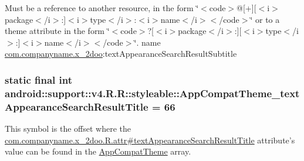 Must be a reference to another resource, in the form \char`\"{}$<$code$>$@\mbox{[}+\mbox{]}\mbox{[}$<$i$>$package$<$/i$>$:\mbox{]}$<$i$>$type$<$/i$>$:$<$i$>$name$<$/i$>$$<$/code$>$\char`\"{} or to a theme attribute in the form \char`\"{}$<$code$>$?\mbox{[}$<$i$>$package$<$/i$>$:\mbox{]}\mbox{[}$<$i$>$type$<$/i$>$:\mbox{]}$<$i$>$name$<$/i$>$$<$/code$>$\char`\"{}.  name \hyperlink{namespacecom_1_1companyname_1_1x__2doo}{com.companyname.x\_\-2doo}:textAppearanceSearchResultSubtitle \hypertarget{classandroid_1_1support_1_1v4_1_1_r_1_1styleable_81d84885678ba9df1805cb1815d7317c}{
\subsubsection[{AppCompatTheme\_\-textAppearanceSearchResultTitle}]{\setlength{\rightskip}{0pt plus 5cm}static final int android::support::v4.R.R::styleable::AppCompatTheme\_\-textAppearanceSearchResultTitle = 66}}
\label{classandroid_1_1support_1_1v4_1_1_r_1_1styleable_81d84885678ba9df1805cb1815d7317c}


This symbol is the offset where the \hyperlink{classcom_1_1companyname_1_1x__2doo_1_1_r_1_1attr_653ca15316f25ee3eb81ee1122542ba0}{com.companyname.x\_\-2doo.R.attr\#textAppearanceSearchResultTitle} attribute's value can be found in the \hyperlink{classandroid_1_1support_1_1v4_1_1_r_1_1styleable_0873e92ba21076bb5a4aeadeb7f5779f}{AppCompatTheme} array.

